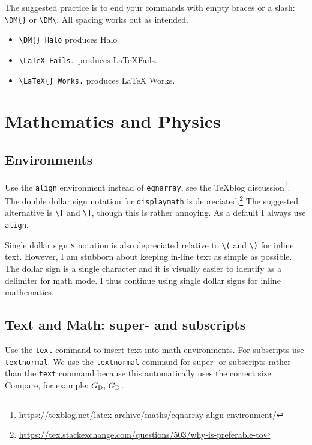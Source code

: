 The suggested practice is to end your commands with empty braces or a slash: \verb!\DM{}! or \verb!\DM\!. All spacing works out as intended. 
\begin{itemize}
	\item \verb!\DM{} Halo! produces \DM{} Halo
	\item \verb!\LaTeX Fails.! produces \LaTeX Fails.
	\item \verb!\LaTeX{} Works.! produces \LaTeX{} Works.
\end{itemize}






\section{Mathematics and Physics}

\subsection{Environments}

Use the \texttt{align} environment instead of \texttt{eqnarray}, see the TeXblog discussion\footnote{\url{https://texblog.net/latex-archive/maths/eqnarray-align-environment/}}. The double dollar sign notation for \texttt{displaymath} is depreciated.\footnote{\url{https://tex.stackexchange.com/questions/503/why-is-preferable-to}} The suggested alternative is \verb!\[! and \verb!\]!, though this is rather annoying. As a default I always use \texttt{align}.

Single dollar sign \verb!$! notation is also depreciated relative to \verb!\(! and \verb!\)! for inline text. However, I am stubborn about keeping in-line text as simple as possible. The dollar sign is a single character and it is visually easier to identify as a delimiter for math mode. I thus continue using single dollar signs for inline mathematics. 


\subsection{Text and Math: super- and subscripts}

Use the \texttt{text} command to insert text into math environments. For subscripts use \texttt{textnormal}. 
% 
We use the \texttt{textnormal} command for super- or subscripts rather than the \texttt{text} command because this automatically uses the correct size. Compare, for example: $G_\textnormal{D},\, G_\text{D}$.

